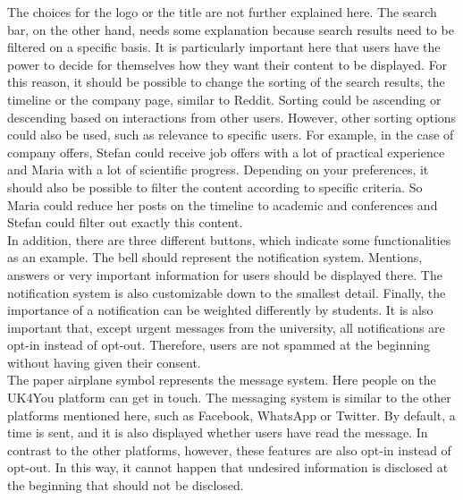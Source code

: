 The choices for the logo or the title are not further explained here.
The search bar, on the other hand, needs some explanation because search results need to be filtered on a specific basis.
It is particularly important here that users have the power to decide for themselves how they want their content to be displayed.
For this reason, it should be possible to change the sorting of the search results, the timeline or the company page, similar to Reddit.
Sorting could be ascending or descending based on interactions from other users.
However, other sorting options could also be used, such as relevance to specific users.
For example, in the case of company offers, Stefan could receive job offers with a lot of practical experience and Maria with a lot of scientific progress.
Depending on your preferences, it should also be possible to filter the content according to specific criteria.
So Maria could reduce her posts on the timeline to academic and conferences and Stefan could filter out exactly this content.\\

In addition, there are three different buttons, which indicate some functionalities as an example.
The bell should represent the notification system.
Mentions, answers or very important information for users should be displayed there.
The notification system is also customizable down to the smallest detail.
Finally, the importance of a notification can be weighted differently by students.
It is also important that, except urgent messages from the university, all notifications are opt-in instead of opt-out.
Therefore, users are not spammed at the beginning without having given their consent.\\

The paper airplane symbol represents the message system.
Here people on the UK4You platform can get in touch.
The messaging system is similar to the other platforms mentioned here, such as Facebook, WhatsApp or Twitter.
By default, a time is sent, and it is also displayed whether users have read the message.
In contrast to the other platforms, however, these features are also opt-in instead of opt-out.
In this way, it cannot happen that undesired information is disclosed at the beginning that should not be disclosed.\\





